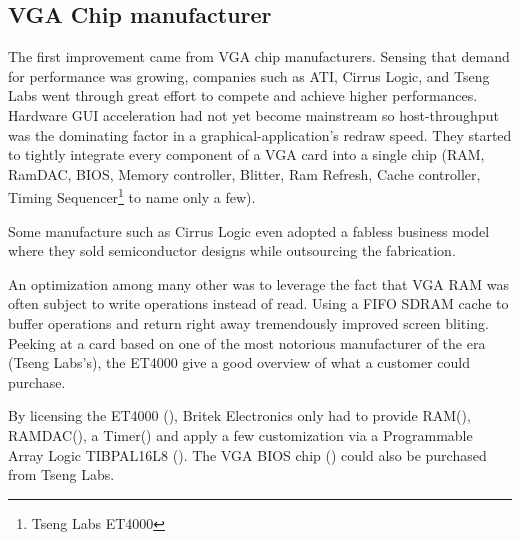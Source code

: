\subsection{VGA Chip manufacturer}
The first improvement came from VGA chip manufacturers. Sensing that demand for performance was growing, companies such as ATI, Cirrus Logic, and Tseng Labs went through great effort to compete and achieve higher performances. Hardware GUI acceleration had not yet become mainstream so host-throughput was the dominating factor in a graphical-application's redraw speed. They started to tightly integrate every component of a VGA card into a single chip (RAM, RamDAC, BIOS, Memory controller, Blitter, Ram Refresh, Cache controller, Timing Sequencer\footnote{Tseng Labs ET4000} to name only a few).\\
\par
Some manufacture such as Cirrus Logic even adopted a fabless business model where they sold semiconductor designs while outsourcing the fabrication.


An optimization among many other was to leverage the fact that VGA RAM was often subject to write operations instead of read. Using a FIFO SDRAM cache to buffer operations and return right away tremendously improved screen bliting. Peeking at a card based on one of the most notorious manufacturer of the era (Tseng Labs's), the ET4000 give a good overview of what a customer could purchase.\\ 
\par
{}
\par
By licensing the ET4000 (), Britek Electronics only had to provide RAM(), RAMDAC(), a Timer() and apply a few customization via a Programmable Array Logic TIBPAL16L8 (). The VGA BIOS chip () could also be purchased from Tseng Labs.\\
\par
\vspace{10pt}

\par



